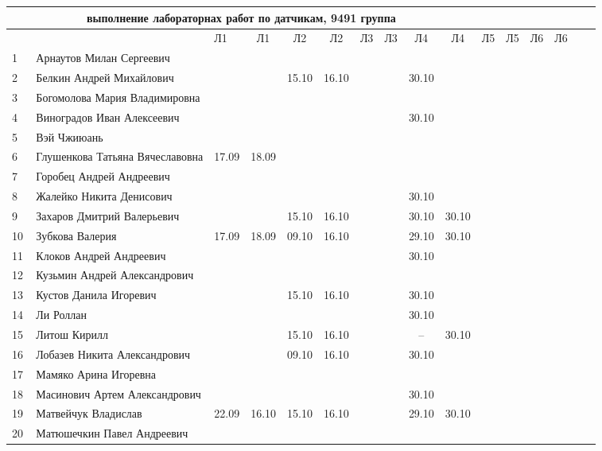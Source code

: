 \newpage
%


\newpage
%
\begin{tabular}{l|llccccccccccccc}
\multicolumn{10}{c}{выполнение лабораторнах работ по датчикам, 9491 группа} \\
\toprule
&&Л1&Л1& Л2&Л2& Л3&Л3& Л4&Л4 &Л5&Л5& Л6&Л6\\
\midrule
1\,& Арнаутов Милан Сергеевич         \\
2\,& Белкин Андрей Михайлович         &    &      &15.10&16.10 &     &      &30.10&\\
3\,& Богомолова Мария Владимировна    \\
4\,& Виноградов Иван Алексеевич       &     &     &     &      &     &      &30.10&\\
5\,& Вэй Чжиюань                      \\
\midrule
6\,& Глушенкова Татьяна Вячеславовна  &17.09&18.09&     &      &     &\\
7\,& Горобец Андрей Андреевич         \\
8\,& Жалейко Никита Денисович         &     &     &     &      &     &      &30.10&\\
9\,& Захаров Дмитрий Валерьевич       &     &     &15.10&16.10 &     &      &30.10&30.10\\
10\,& Зубкова Валерия                 &17.09&18.09&09.10&16.10 &     &      &29.10&30.10\\
\midrule
11\,& Клоков Андрей Андреевич         &     &     &     &      &     &      &30.10&\\
12\,& Кузьмин Андрей Александрович    \\
13\,& Кустов Данила Игоревич          &     &     &15.10&16.10 &     &      &30.10&\\
14\,& Ли Роллан                       &     &     &     &      &     &      &30.10&\\
15\,& Литош Кирилл                    &     &     &15.10&16.10 &     &      & --  &30.10\\
\midrule
16\,& Лобазев Никита Александрович    &     &     &09.10&16.10 &     &      &30.10&\\
17\,& Мамяко Арина Игоревна           \\
18\,& Масинович Артем Александрович   &     &     &     &      &     &      &30.10&\\
19\,& Матвейчук Владислав             &22.09&16.10&15.10&16.10 &     &      &29.10&30.10\\
20\,& Матюшечкин Павел Андреевич      \\

\end{tabular}
